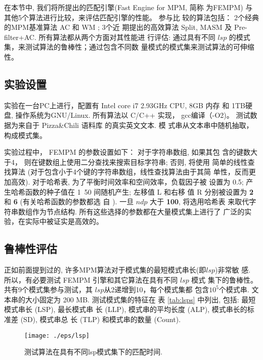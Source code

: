 \documentclass{ws-ijprai}
\begin{document}
在本节中, 我们将所提出的匹配引擎(Fast Engine for MPM, 简称
为\textsf{FEMPM}) 与其他5个算法进行比较，来评估匹配引擎的性能。 参与比
较的算法包括： 2个经典的MPM基准算法 \textsf{AC} 和 \textsf{WM} ; 3个近
期提出的高效算法 \textsf{Split},
\textsf{MASM} 及 \textsf{Pre-filter+AC}. 所有算法都从两个方面对其性能进
行评估: 通过具有不同 $lsp$ 的模式集，来测试算法的鲁棒性；通过包含不同数
量模式的模式集来测试算法的可伸缩性。

\subsection{实验设置}


实验在一台PC上进行，配置有 Intel core i7 2.93GHz CPU, 8GB 内存 和 1TB硬
盘, 操作系统为GNU/Linux. 所有算法以 C/C++ 实现， gcc编译（-O2)。 测试数
据为来自于 Pizza\;\&\;Chili 语料库 \cite{pizzachil} 的真实英文文本. 模
式串从文本串中随机抽取，构成模式集。

实验过程中， \textsf{FEMPM} 的参数设置如下： 对于字符串数组, 如果其包
含的键数大于4， 则在键数组上使用二分查找来搜索目标字符串; 否则, 将使用
简单的线性查找算法 (对于包含小于4个键的字符串数组，线性查找算法由于其简
单性，反而更加高效). 对于哈希表, 为了平衡时间效率和空间效率，负载因子被
设置为 {0.5}; 产生哈希函数的种子值在 1~50 间随机产生; 左移值 L 和右移
值 R 分别被设置为 \textbf{2} 和 \textbf{6} (有关哈希函数的参数都选
自 \cite{Ramakrishna1997}). 一旦 $ndp$ 大于 \textbf{100}, 将选用哈希表
来取代字符串数组作为节点结构. 所有这些选择的参数都在大量模式集上进行了
广泛的实验，在实际中被证实是高效的。

\subsection{鲁棒性评估}

正如前面提到过的, 许多MPM算法对于模式集的最短模式串长(即$lsp$)非常敏
感. 所以，有必要测试 \textsf{FEMPM} 引擎和其它算法在具有不同 $lsp$ 模式
集下的鲁棒性。 共有9个模式集参与测试，其 $lsp$从2递增到10，每个模式集都
包含$10^5$个模式串. 文本串的大小固定为 200 MB. 测试模式集的特征在
表 \ref{tab:lsps} 中列出, 包括: 最短模式串长 (LSP), 最长模式串
长 (LLP), 模式串的平均长度 (ALP), 模式串长的标准差 (SD), 模式串总
长 (TLP) 和模式串的数量 (Count).

\begin{figure}[htbp]
  \centering
  \texttt{[image: ./eps/lsp]}
  \caption{测试算法在具有不同lsp模式集下的匹配时间.}
  \label{fig:lsp}
\end{figure}
\end{document}
